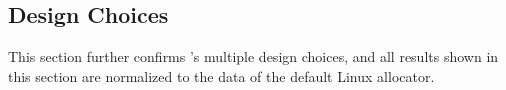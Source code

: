 



 

\subsection{Design Choices}
\label{sec:design}

This section further confirms \NM{}'s multiple design choices, and all results shown in this section are normalized to the data of the default Linux allocator.  


